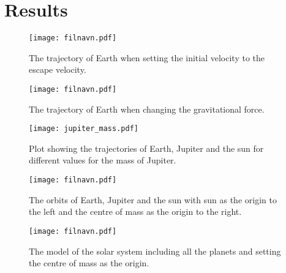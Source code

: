 \section{Results}
\label{sec:results}

\begin{figure}[htbp]
	\centering
	\texttt{[image: filnavn.pdf]}
	\caption{The trajectory of Earth when setting the initial velocity to the escape velocity.}
	\label{fig:earth escape}
\end{figure}

\begin{figure}[htbp]
	\centering
	\texttt{[image: filnavn.pdf]}
	\caption{The trajectory of Earth when changing the gravitational force.}
	\label{fig:changing beta}
\end{figure}

\begin{figure}[htbp]
	\centering
	\texttt{[image: jupiter\_mass.pdf]}
	\caption{Plot showing the trajectories of Earth, Jupiter and the sun for different values for the mass of Jupiter.}
	\label{fig:jupiter mass}
\end{figure}

\begin{figure}[htbp]
	\centering
	\texttt{[image: filnavn.pdf]}
	\caption{The orbits of Earth, Jupiter and the sun with sun as the origin to the left and the centre of mass as the origin to the right.}
	\label{fig:centre of mass}
\end{figure}

\begin{figure}[htbp]
	\centering
	\texttt{[image: filnavn.pdf]}
	\caption{The model of the solar system including all the planets and setting the centre of mass as the origin.}
	\label{fig:solar system}
\end{figure}